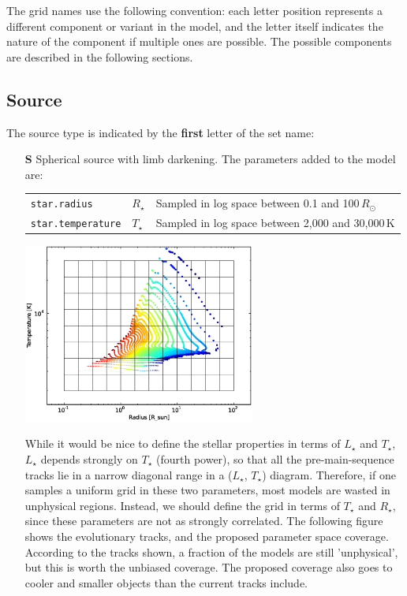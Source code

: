 \documentclass[10pt]{article}
\newcommand{\lstar}{L_\star}
\newcommand{\tstar}{T_\star}
\newcommand{\rsun}{R_\odot}
\newcommand{\rstar}{R_\star}
\begin{document}
The grid names use the following convention: each letter position represents a different component or variant in the model, and the letter itself indicates the nature of the component if multiple ones are possible. The possible components are described in the following sections.

\subsection{Source}

The source type is indicated by the \textbf{first} letter of the set name:

\begin{itemize}

\item[\textbf{S}] Spherical source with limb darkening. The parameters added to the model are:

\begin{center}
  \begin{tabular}{llp{4in}}
    \texttt{star.radius} & $\rstar$ & Sampled in log space between 0.1 and 100\,$\rsun$ \\
    \texttt{star.temperature} & $\tstar$ & Sampled in log space between 2,000 and 30,000\,K \\
  \end{tabular}
\end{center}

\begin{center}
\includegraphics[width=3in]{temperature_vs_radius.eps}
\end{center}

While it would be nice to define the stellar properties in terms of $\lstar$ and $\tstar$, $\lstar$ depends strongly on $\tstar$ (fourth power), so that all the pre-main-sequence tracks lie in a narrow diagonal range in a ($\lstar$, $\tstar$) diagram. Therefore, if one samples a uniform grid in these two parameters, most models are wasted in unphysical regions. Instead, we should define the grid in terms of $\tstar$ and $\rstar$, since these parameters are not as strongly correlated. The following figure shows the evolutionary tracks, and the proposed parameter space coverage. According to the tracks shown, a fraction of the models are still 'unphysical', but this is worth the unbiased coverage. The proposed coverage also goes to cooler and smaller objects than the current tracks include.


\end{itemize}
\end{document}
